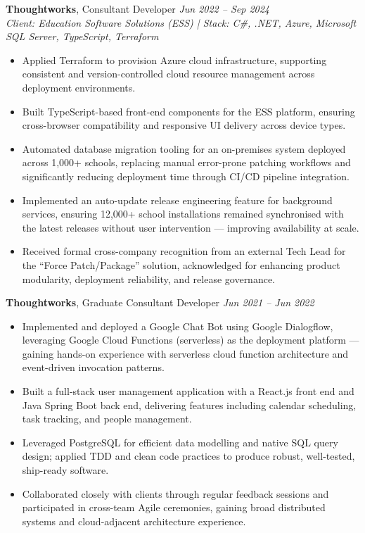 \documentclass[a4paper,10pt]{article}
\begin{document}
\textbf{Thoughtworks}, Consultant Developer \hfill \textit{Jun 2022 -- Sep 2024}\\
\textit{Client: Education Software Solutions (ESS) | Stack: C\#, .NET, Azure, Microsoft SQL Server, TypeScript, Terraform}
\begin{itemize}[leftmargin=1.5em, itemsep=0.01em]
  \item Applied Terraform to provision Azure cloud infrastructure, supporting consistent and version-controlled cloud resource management across deployment environments.
  \item Built TypeScript-based front-end components for the ESS platform, ensuring cross-browser compatibility and responsive UI delivery across device types.
  \item Automated database migration tooling for an on-premises system deployed across 1,000+ schools, replacing manual error-prone patching workflows and significantly reducing deployment time through CI/CD pipeline integration.
  \item Implemented an auto-update release engineering feature for background services, ensuring 12,000+ school installations remained synchronised with the latest releases without user intervention — improving availability at scale.
  \item Received formal cross-company recognition from an external Tech Lead for the ``Force Patch/Package'' solution, acknowledged for enhancing product modularity, deployment reliability, and release governance.
\end{itemize}

\textbf{Thoughtworks}, Graduate Consultant Developer \hfill \textit{Jun 2021 -- Jun 2022}
\begin{itemize}[leftmargin=1.5em, itemsep=0.01em]
  \item Implemented and deployed a Google Chat Bot using Google Dialogflow, leveraging Google Cloud Functions (serverless) as the deployment platform — gaining hands-on experience with serverless cloud function architecture and event-driven invocation patterns.
  \item Built a full-stack user management application with a React.js front end and Java Spring Boot back end, delivering features including calendar scheduling, task tracking, and people management.
  \item Leveraged PostgreSQL for efficient data modelling and native SQL query design; applied TDD and clean code practices to produce robust, well-tested, ship-ready software.
  \item Collaborated closely with clients through regular feedback sessions and participated in cross-team Agile ceremonies, gaining broad distributed systems and cloud-adjacent architecture experience.
\end{itemize}
\end{document}
